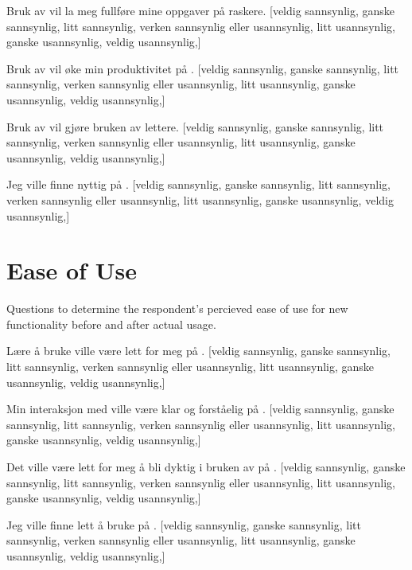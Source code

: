 \begin{items}
  \item Bruk av \siste{} vil la meg fullføre mine oppgaver på \urort{}
    raskere.
    [veldig sannsynlig, ganske sannsynlig, litt sannsynlig,
    verken sannsynlig eller usannsynlig,
    litt usannsynlig, ganske usannsynlig, veldig usannsynlig,]
  \item Bruk av \siste{} vil øke min produktivitet på \urort{}.
    [veldig sannsynlig, ganske sannsynlig, litt sannsynlig,
    verken sannsynlig eller usannsynlig,
    litt usannsynlig, ganske usannsynlig, veldig usannsynlig,]
  \item Bruk av \siste{} vil gjøre bruken av \urort{} lettere.
    [veldig sannsynlig, ganske sannsynlig, litt sannsynlig,
    verken sannsynlig eller usannsynlig,
    litt usannsynlig, ganske usannsynlig, veldig usannsynlig,]
  \item Jeg ville finne \siste{} nyttig på \urort{}.
    [veldig sannsynlig, ganske sannsynlig, litt sannsynlig,
    verken sannsynlig eller usannsynlig,
    litt usannsynlig, ganske usannsynlig, veldig usannsynlig,]
\end{items}

\section{Ease of Use}

Questions to determine the respondent's percieved ease of use for new
functionality before and after actual usage.

\begin{items}
  \item Lære å bruke \siste{} ville være lett for meg på \urort{}.
    [veldig sannsynlig, ganske sannsynlig, litt sannsynlig,
    verken sannsynlig eller usannsynlig,
    litt usannsynlig, ganske usannsynlig, veldig usannsynlig,]
  \item Min interaksjon med \siste{} ville være klar og forståelig
    på \urort{}.
    [veldig sannsynlig, ganske sannsynlig, litt sannsynlig,
    verken sannsynlig eller usannsynlig,
    litt usannsynlig, ganske usannsynlig, veldig usannsynlig,]
  \item Det ville være lett for meg å bli dyktig i bruken av \siste{}
    på \urort{}.
    [veldig sannsynlig, ganske sannsynlig, litt sannsynlig,
    verken sannsynlig eller usannsynlig,
    litt usannsynlig, ganske usannsynlig, veldig usannsynlig,]
  \item Jeg ville finne \siste{} lett å bruke på \urort{}.
    [veldig sannsynlig, ganske sannsynlig, litt sannsynlig,
    verken sannsynlig eller usannsynlig,
    litt usannsynlig, ganske usannsynlig, veldig usannsynlig,]
\end{items}

